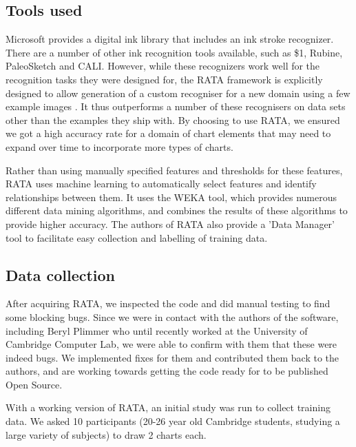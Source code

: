 	\subsection{Tools used}
	Microsoft provides a digital ink library that includes an ink stroke recognizer. There are a number of other ink recognition tools available, such as \$1, Rubine, PaleoSketch and CALI. However, while these recognizers work well for the recognition tasks they were designed for, the RATA framework is explicitly designed to allow generation of a custom recogniser for a new domain using a few example images \citep{Chang2010}. It thus outperforms a number of these recognisers on data sets other than the examples they ship with. By choosing to use RATA, we ensured we got a high accuracy rate for a domain of chart elements that may need to expand over time to incorporate more types of charts.
	
	Rather than using manually specified features and thresholds for these features, RATA uses machine learning to automatically select features and identify relationships between them. It uses the WEKA tool, which provides numerous different data mining algorithms, and combines the results of these algorithms to provide higher accuracy. The authors of RATA also provide a 'Data Manager' tool to facilitate easy collection and labelling of training data. 
	
	\subsection{Data collection}
	After acquiring RATA, we inspected the code and did manual testing to find some blocking bugs. Since we were in contact with the authors of the software, including Beryl Plimmer who until recently worked at the University of Cambridge Computer Lab, we were able to confirm with them that these were indeed bugs. We implemented fixes for them and contributed them back to the authors, and are working towards getting the code ready for to be published Open Source.
	
	With a working version of RATA, an initial study was run to collect training data. We asked 10 participants (20-26 year old Cambridge students, studying a large variety of subjects) to draw 2 charts each. 
	
